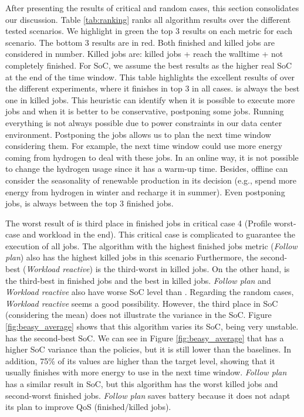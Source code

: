 After presenting the results of critical and random cases, this section consolidates our discussion. Table \ref{tab:ranking} ranks all algorithm results over the different tested scenarios. We highlight in green the top 3 results on each metric for each scenario. The bottom 3 results are in red. Both finished and killed jobs are considered in number. Killed jobs are: killed jobs + reach the walltime + not completely finished. For SoC, we assume the best results as the higher real SoC at the end of the time window. This table highlights the excellent results of \emph{\systemName} over the different experiments, where it finishes in top 3 in all cases. \emph{\systemName} is always the best one in killed jobs. This heuristic can identify when it is possible to execute more jobs and when it is better to be conservative, postponing some jobs. Running everything is not always possible due to power constraints in our data center environment. Postponing the jobs allows us to plan the next time window considering them. For example, the next time window could use more energy coming from hydrogen to deal with these jobs. In an online way, it is not possible to change the hydrogen usage since it has a warm-up time. Besides, offline can consider the seasonality of renewable production in its decision (e.g., spend more energy from hydrogen in winter and recharge it in summer). Even postponing jobs, \emph{\systemName} is always between the top 3 finished jobs. 

The worst result of \emph{\systemName} is third place in finished jobs in critical case 4 (Profile worst-case and workload in the end). This critical case is complicated to guarantee the execution of all jobs. The algorithm with the highest finished jobs metric (\emph{Follow plan}) also has the highest killed jobs in this scenario Furthermore, the second-best (\emph{Workload reactive}) is the third-worst in killed jobs. On the other hand, \emph{\systemName} is the third-best in finished jobs and the best in killed jobs. \emph{Follow plan} and \emph{Workload reactive} also have worse SoC level than \emph{\systemName}. Regarding the random cases, \emph{Workload reactive} seems a good possibility. However, the third place in SoC (considering the mean) does not illustrate the variance in the SoC. Figure \ref{fig:beasy_average} shows that this algorithm varies its SoC, being very unstable. \emph{\systemName} has the second-best SoC. We can see in Figure \ref{fig:beasy_average} that \emph{\systemName} has a higher SoC variance than the policies, but it is still lower than the baselines. In addition, 75\% of its values are higher than the target level, showing that it usually finishes with more energy to use in the next time window. \emph{Follow plan} has a similar result in SoC, but this algorithm has the worst killed jobs and second-worst finished jobs. \emph{Follow plan} saves battery because it does not adapt its plan to improve QoS (finished/killed jobs). 

